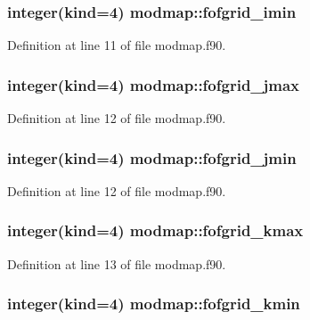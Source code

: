 \hypertarget{classmodmap_a4c96661037ebd0e043cf2967b7e94067}{
\subsubsection[{fofgrid\-\_\-imin}]{\setlength{\rightskip}{0pt plus 5cm}integer(kind=4) modmap\-::fofgrid\-\_\-imin}}\label{classmodmap_a4c96661037ebd0e043cf2967b7e94067}


Definition at line 11 of file modmap.\-f90.

\hypertarget{classmodmap_a1644332b29d20583060c9316d8cd2fa1}{
\subsubsection[{fofgrid\-\_\-jmax}]{\setlength{\rightskip}{0pt plus 5cm}integer(kind=4) modmap\-::fofgrid\-\_\-jmax}}\label{classmodmap_a1644332b29d20583060c9316d8cd2fa1}


Definition at line 12 of file modmap.\-f90.

\hypertarget{classmodmap_ac44fd964c6a2812634e903df91c5bcb6}{
\subsubsection[{fofgrid\-\_\-jmin}]{\setlength{\rightskip}{0pt plus 5cm}integer(kind=4) modmap\-::fofgrid\-\_\-jmin}}\label{classmodmap_ac44fd964c6a2812634e903df91c5bcb6}


Definition at line 12 of file modmap.\-f90.

\hypertarget{classmodmap_a7273a00ef7481fa382b6016d39a752e3}{
\subsubsection[{fofgrid\-\_\-kmax}]{\setlength{\rightskip}{0pt plus 5cm}integer(kind=4) modmap\-::fofgrid\-\_\-kmax}}\label{classmodmap_a7273a00ef7481fa382b6016d39a752e3}


Definition at line 13 of file modmap.\-f90.

\hypertarget{classmodmap_ac4f40bdda34481044d92691776976abc}{
\subsubsection[{fofgrid\-\_\-kmin}]{\setlength{\rightskip}{0pt plus 5cm}integer(kind=4) modmap\-::fofgrid\-\_\-kmin}}\label{classmodmap_ac4f40bdda34481044d92691776976abc}


